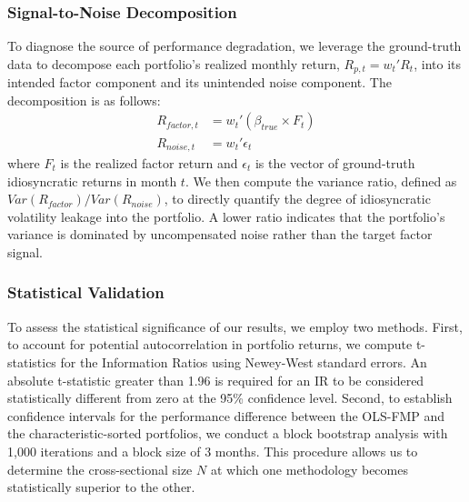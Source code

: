 \documentclass[]{article}
\begin{document}
\subsubsection{Signal-to-Noise Decomposition}
To diagnose the source of performance degradation, we leverage the ground-truth data to decompose each portfolio's realized monthly return, $R_{p,t} = w_t' R_t$, into its intended factor component and its unintended noise component. The decomposition is as follows:
\begin{align}
R_{factor, t} &= w_t' (\beta_{true} \times F_t) \\
R_{noise, t} &= w_t' \epsilon_t
\end{align}
where $F_t$ is the realized factor return and $\epsilon_t$ is the vector of ground-truth idiosyncratic returns in month $t$. We then compute the variance ratio, defined as $Var(R_{factor}) / Var(R_{noise})$, to directly quantify the degree of idiosyncratic volatility leakage into the portfolio. A lower ratio indicates that the portfolio's variance is dominated by uncompensated noise rather than the target factor signal.

\subsubsection{Statistical Validation}
To assess the statistical significance of our results, we employ two methods. First, to account for potential autocorrelation in portfolio returns, we compute t-statistics for the Information Ratios using Newey-West standard errors. An absolute t-statistic greater than 1.96 is required for an IR to be considered statistically different from zero at the 95\% confidence level. Second, to establish confidence intervals for the performance difference between the OLS-FMP and the characteristic-sorted portfolios, we conduct a block bootstrap analysis with 1,000 iterations and a block size of 3 months. This procedure allows us to determine the cross-sectional size $N$ at which one methodology becomes statistically superior to the other.
\end{document}
